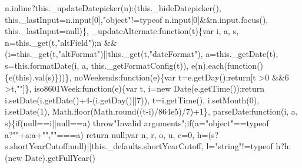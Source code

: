 n.inline?this._updateDatepicker(n):(this._hideDatepicker(), this._lastInput=n.input[0],"object"!=typeof n.input[0]&&n.input.focus(), this._lastInput=null)\}, _updateAlternate:function(t)\{var i, a, s, n=this._get(t,"altField");n &&(i=this._get(t,"altFormat")||this._get(t,"dateFormat"), a=this._getDate(t), s=this.formatDate(i, a, this._getFormatConfig(t)), e(n).each(function()\{e(this).val(s)\}))\}, noWeekends:function(e)\{var t=e.getDay();return[t >0 &&6 >t,""]\}, iso8601Week:function(e)\{var t, i=new Date(e.getTime());return i.setDate(i.getDate()+4-(i.getDay()||7)), t=i.getTime(), i.setMonth(0), i.setDate(1), Math.floor(Math.round((t-i)/864e5)/7)+1\}, parseDate:function(i, a, s)\{if(null==i||null==a) throw"Invalid arguments";if(a="object"==typeof a?""+a:a+"",""===a) return null;var n, r, o, u, c=0, h=(s?s.shortYearCutoff:null)||this._defaults.shortYearCutoff, l="string"!=typeof h?h:(new Date).getFullYear()%